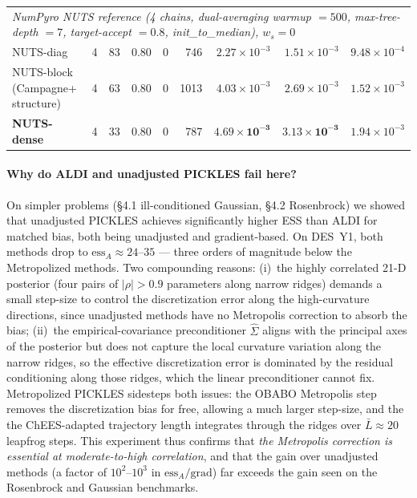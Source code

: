 \documentclass{article}
\begin{document}
\begin{table}[t]
\begin{tabular}{l rrrr rrrr}
\midrule
\multicolumn{9}{l}{\emph{NumPyro NUTS reference (4 chains, dual-averaging warmup $= 500$, max-tree-depth $= 7$, target-accept $= 0.8$, init\_to\_median), $w_s = 0$}} \\
NUTS-diag                     &  4 & 83   & 0.80 & 0 & 746  & $2.27\!\times\!10^{-3}$ & $1.51\!\times\!10^{-3}$ & $9.48\!\times\!10^{-4}$ \\
NUTS-block (Campagne+ structure) & 4 & 63 & 0.80 & 0 & 1013 & $4.03\!\times\!10^{-3}$ & $2.69\!\times\!10^{-3}$ & $1.52\!\times\!10^{-3}$ \\
\textbf{NUTS-dense}           &  4 & 33   & 0.80 & 0  & 787  & $\boldsymbol{4.69\!\times\!10^{-3}}$ & $\boldsymbol{3.13\!\times\!10^{-3}}$ & $1.94\!\times\!10^{-3}$ \\
\bottomrule
\end{tabular}
\end{table}

\paragraph{Why do ALDI and unadjusted PICKLES fail here?} On simpler
problems (\S4.1 ill-conditioned Gaussian, \S4.2 Rosenbrock) we showed
that unadjusted PICKLES achieves significantly higher ESS than ALDI for
matched bias, both being unadjusted and gradient-based. On DES~Y1, both
methods drop to $\mathrm{ess}_A\approx 24$--$35$ — three orders of
magnitude below the Metropolized methods. Two compounding reasons:
(i)~the highly correlated 21-D posterior (four pairs of $|\rho|>0.9$
parameters along narrow ridges) demands a small step-size to control
the discretization error along the high-curvature directions, since
unadjusted methods have no Metropolis correction to absorb the bias;
(ii)~the empirical-covariance preconditioner $\hat{\Sigma}$ aligns with
the principal axes of the posterior but does not capture the local
curvature variation along the narrow ridges, so the effective
discretization error is dominated by the residual conditioning along
those ridges, which the linear preconditioner cannot fix. Metropolized
PICKLES sidesteps both issues: the OBABO Metropolis step removes the
discretization bias for free, allowing a much larger step-size, and the
the ChEES-adapted trajectory length integrates through the ridges over
$\bar{L}\approx 20$ leapfrog steps. This experiment thus confirms that
\emph{the Metropolis correction is essential at moderate-to-high
correlation}, and that the gain over unadjusted methods (a factor of
$10^2$--$10^3$ in $\mathrm{ess}_A/\mathrm{grad}$) far exceeds the gain
seen on the Rosenbrock and Gaussian benchmarks.
\end{document}
